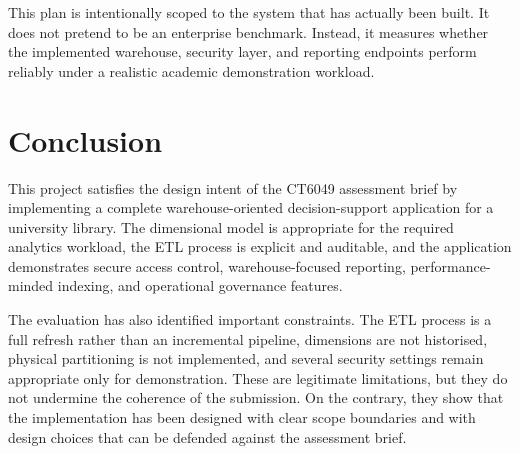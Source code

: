\documentclass[12pt,a4paper]{article}
\begin{document}
This plan is intentionally scoped to the system that has actually been built. It does not pretend to be an enterprise benchmark. Instead, it measures whether the implemented warehouse, security layer, and reporting endpoints perform reliably under a realistic academic demonstration workload.

\section{Conclusion}
This project satisfies the design intent of the CT6049 assessment brief by implementing a complete warehouse-oriented decision-support application for a university library. The dimensional model is appropriate for the required analytics workload, the ETL process is explicit and auditable, and the application demonstrates secure access control, warehouse-focused reporting, performance-minded indexing, and operational governance features.

The evaluation has also identified important constraints. The ETL process is a full refresh rather than an incremental pipeline, dimensions are not historised, physical partitioning is not implemented, and several security settings remain appropriate only for demonstration. These are legitimate limitations, but they do not undermine the coherence of the submission. On the contrary, they show that the implementation has been designed with clear scope boundaries and with design choices that can be defended against the assessment brief.
\end{document}
